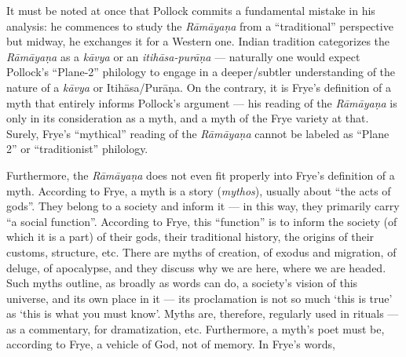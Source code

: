 It must be noted at once that Pollock commits a fundamental mistake in his analysis: he commences to study the {\sl Rāmāyaṇa} from a “traditional” perspective but midway, he exchanges it for a Western one.  Indian tradition categorizes the {\sl Rāmāyaṇa} as a {\sl kāvya} or an {\sl itihāsa-purāṇa} --- naturally one would expect Pollock’s “Plane-2” philology to engage in a deeper/subtler understanding of the nature of a {\sl kāvya} or Itihāsa/Purāṇa. On the contrary, it is Frye’s definition of a myth that entirely informs Pollock’s argument --- his reading of the {\sl Rāmāyaṇa} is only in its consideration as a myth, and a myth of the Frye variety at that. Surely, Frye’s “mythical” reading of the {\sl Rāmāyaṇa} cannot be labeled as “Plane 2” or “traditionist” philology.

Furthermore, the {\sl Rāmāyaṇa} does not even fit properly into Frye’s definition of a myth. According to Frye, a myth is a story ({\sl mythos}), usually about “the acts of gods”. They belong to a society and inform it --- in this way, they primarily carry “a social function”. According to Frye, this “function” is to inform the society (of which it is a part) of their gods, their traditional history, the origins of their customs, structure, etc. There are myths of creation, of exodus and migration, of deluge, of apocalypse, and they discuss why we are here, where we are headed. Such myths outline, as broadly as words can do, a society’s vision of this universe, and its own place in it --- its proclamation is not so much ‘this is true’ as ‘this is what you must know’. Myths are, therefore, regularly used in rituals --- as a commentary, for dramatization, etc. Furthermore, a myth’s poet must be, according to Frye, a vehicle of God, not of memory. In Frye’s words, 

